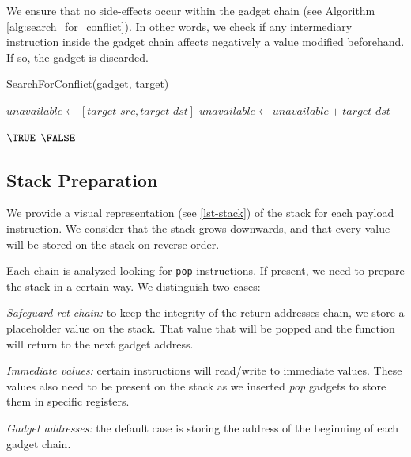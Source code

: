 \documentclass[10pt,twocolumn]{article}
\begin{document}
We ensure that no side-effects occur within the gadget chain (see Algorithm
\autoref{alg:search_for_conflict}). In other words,
we check if any intermediary instruction inside the gadget chain affects
negatively a value modified beforehand. If so, the gadget is discarded.

\begin{algorithm}
    \caption{SearchForConflict(gadget, target)}
    \label{alg:search_for_conflict}
    \begin{algorithmic}[1]
        \STATE $unavailable \leftarrow [target\_src, target\_dst]$
            \STATE $unavailable \leftarrow unavailable + target\_dst$
        \ENDIF

            \RETURN $\TRUE$
            \ENDIF
        \ENDFOR
        \RETURN $\FALSE$
    \end{algorithmic}
\end{algorithm}

\subsection{Stack Preparation}

We provide a visual representation (see \autoref{lst-stack}) of the stack for
each payload instruction.  We consider that the stack grows downwards, and that
every value will be stored on the stack on reverse order.

Each chain is analyzed looking for \texttt{pop} instructions. If present, we
need to prepare the stack in a certain way. We distinguish
two cases:

\textit{Safeguard ret chain:} to keep the integrity of the return addresses
chain, we store a placeholder value on the stack. That value that will be
popped and the function will return to the next gadget address.

\textit{Immediate values:} certain instructions will read/write to immediate
values. These values also need to be present on the stack as we inserted
\textit{pop} gadgets to store them in specific registers.

\textit{Gadget addresses:} the default case is storing the address of the
beginning of each gadget chain.
\end{document}
